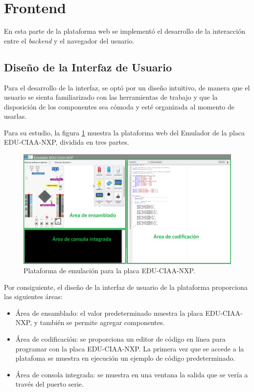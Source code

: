 \section{Frontend}

En esta parte de la plataforma web se implementó el desarrollo de la interacción entre el \textit{backend} y el navegador del usuario.

\subsection{Diseño de la Interfaz de Usuario}

Para el desarrollo de la interfaz, se optó por un diseño intuitivo, de manera que el usuario se sienta familiarizado con las herramientas de trabajo y que la disposición de los componentes sea cómoda y esté organizada al momento de usarlas.

Para su estudio, la figura \ref{fig:PlataformaEmulador1} muestra la plataforma web del Emulador de la placa EDU-CIAA-NXP, dividida en tres partes.

\begin{figure}[ht]
	\centering
	\includegraphics[scale=.28]{./Figures/PlataformaEmulador.png}
	\caption{Plataforma de emulación para la placa EDU-CIAA-NXP.}
	\label{fig:PlataformaEmulador1}
\end{figure}

Por consiguiente, el diseño de la interfaz de usuario de la plataforma proporciona las siguientes áreas:

\begin{itemize}
	\item Área de ensamblado: el valor predeterminado muestra la placa EDU-CIAA-NXP, y también se permite agregar componentes.
	\item Área de codificación: se proporciona un editor de código en línea para programar con la placa EDU-CIAA-NXP. La primera vez que se accede a la platafoma se muestra en ejecución un ejemplo de código predeterminado.
	\item Área de consola integrada: se muestra en una ventana la salida que se vería a través del puerto serie. 
\end{itemize}

